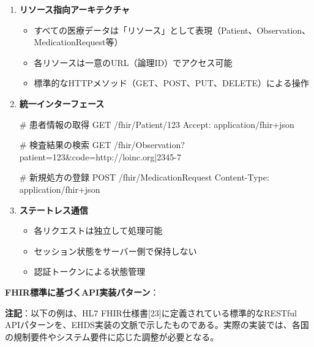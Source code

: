 \documentclass[
  a4paper,
  a4paper,
  11pt]{ltjsbook}
\newenvironment{Shaded}{\begin{snugshade}}{\end{snugshade}}
\newcommand{\NormalTok}[1]{\textcolor[rgb]{0.00,0.23,0.31}{#1}}
\providecommand{\tightlist}{%
  \setlength{\itemsep}{0pt}\setlength{\parskip}{0pt}}
\begin{document}
\begin{enumerate}
\def\labelenumi{\arabic{enumi}.}
\item
  \textbf{リソース指向アーキテクチャ}

  \begin{itemize}
  \tightlist
  \item
    すべての医療データは「リソース」として表現（Patient、Observation、MedicationRequest等）
  \item
    各リソースは一意のURL（論理ID）でアクセス可能
  \item
    標準的なHTTPメソッド（GET、POST、PUT、DELETE）による操作
  \end{itemize}
\item
  \textbf{統一インターフェース}

\begin{Shaded}
\begin{Highlighting}[]
\NormalTok{\# 患者情報の取得}
\NormalTok{GET /fhir/Patient/123}
\NormalTok{Accept: application/fhir+json}

\NormalTok{\# 検査結果の検索}
\NormalTok{GET /fhir/Observation?patient=123\&code=http://loinc.org|2345{-}7}

\NormalTok{\# 新規処方の登録}
\NormalTok{POST /fhir/MedicationRequest}
\NormalTok{Content{-}Type: application/fhir+json}
\end{Highlighting}
\end{Shaded}
\item
  \textbf{ステートレス通信}

  \begin{itemize}
  \tightlist
  \item
    各リクエストは独立して処理可能
  \item
    セッション状態をサーバー側で保持しない
  \item
    認証トークンによる状態管理
  \end{itemize}
\end{enumerate}

\textbf{FHIR標準に基づくAPI実装パターン}：

\begin{tcolorbox}[enhanced jigsaw, toprule=.15mm, bottomtitle=1mm, coltitle=black, left=2mm, opacityback=0, arc=.35mm, colbacktitle=quarto-callout-note-color!10!white, colback=white, opacitybacktitle=0.6, bottomrule=.15mm, rightrule=.15mm, breakable, title=\textcolor{quarto-callout-note-color}{\faInfo}\hspace{0.5em}{Note}, toptitle=1mm, titlerule=0mm, colframe=quarto-callout-note-color-frame, leftrule=.75mm]

\textbf{注記}：以下の例は、HL7
FHIR仕様書{[}23{]}に定義されている標準的なRESTful
APIパターンを、EHDS実装の文脈で示したものである。実際の実装では、各国の規制要件やシステム要件に応じた調整が必要となる。

\end{tcolorbox}
\end{document}

